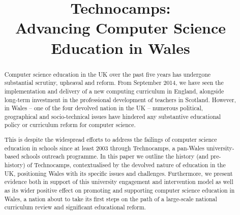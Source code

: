 \documentclass{sig-alternate}
\begin{document}
%

\title{Technocamps:\\[1ex] Advancing Computer Science Education in Wales}


\maketitle

\begin{abstract}
Computer science education in the UK over the past five years has
undergone substantial scrutiny, upheaval and reform. From September
2014, we have seen the implementation and delivery of a new computing
curriculum in England, alongside long-term investment in the
professional development of teachers in Scotland. However, in Wales --
one of the four devolved nation in the UK -- numerous political,
geographical and socio-technical issues have hindered any substantive
educational policy or curriculum reform for computer science.

This is despite the widespread efforts to address the failings of
computer science education in schools since at least 2003 through
Technocamps, a pan-Wales university-based schools outreach
programme. In this paper we outline the history (and pre-history) of
Technocamps, contextualised by the devolved nature of education in the
UK, positioning Wales with its specific issues and
challenges. Furthermore, we present evidence both in support of this
university engagement and intervention model as well as its wider
positive effect on promoting and supporting computer science education
in Wales, a nation about to take its first steps on the path of a
large-scale national curriculum review and significant educational
reform.
\end{abstract}
\end{document}
